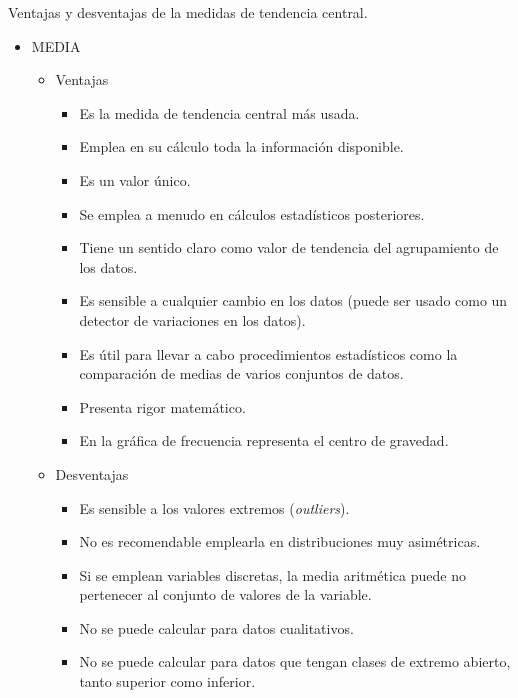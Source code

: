 \vspace{10mm}%
\begin{myalertblock}{Ventajas y desventajas de la medidas de tendencia central.}

\begin{itemize}

\item MEDIA

	\begin{itemize}
	\item Ventajas 
		\begin{itemize}
		\item Es la medida de tendencia central más usada.
		\item Emplea en su cálculo toda la información disponible.
		\item Es un valor único.
		\item Se emplea a menudo en cálculos estadísticos posteriores.
		\item Tiene un sentido claro como valor de tendencia del agrupamiento de los datos.
		\item Es sensible a cualquier cambio en los datos (puede ser usado como un detector de variaciones en los datos).
		\item Es útil para llevar a cabo procedimientos estadísticos como la comparación de medias de varios conjuntos de datos.
		\item Presenta rigor matemático.
		\item En la gráfica de frecuencia representa el centro de gravedad.
		\end{itemize}
	\item Desventajas
		\begin{itemize}
		\item Es sensible a los valores extremos (\emph{outliers}).
		\item No es recomendable emplearla en distribuciones muy asimétricas.
		\item Si se emplean variables discretas, la media aritmética puede no pertenecer al conjunto de valores de la variable.
		\item No se puede calcular para datos cualitativos.
		\item No se puede calcular para datos que tengan clases de extremo abierto, tanto superior como inferior.
		\end{itemize}
	\end{itemize}


\end{itemize}
\end{myalertblock}

